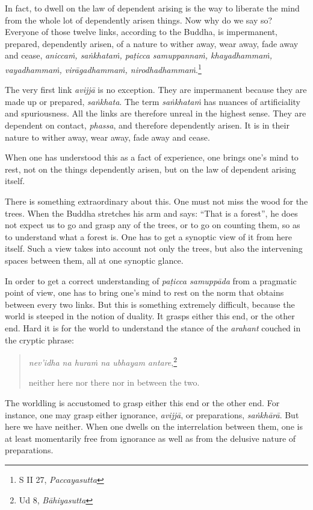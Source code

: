In fact, to dwell on the law of dependent arising is the way to liberate the mind from the whole lot of dependently arisen things. Now why do we say so? Everyone of those twelve links, according to the Buddha, is impermanent, prepared, dependently arisen, of a nature to wither away, wear away, fade away and cease, \emph{aniccaṁ, saṅkhataṁ, paṭicca samuppannaṁ, khayadhammaṁ, vayadhammaṁ, virāgadhammaṁ, nirodhadhammaṁ}.\footnote{S II 27, \emph{Paccayasutta}}

The very first link \emph{avijjā} is no exception. They are impermanent because they are made up or prepared, \emph{saṅkhata}. The term \emph{saṅkhataṁ} has nuances of artificiality and spuriousness. All the links are therefore unreal in the highest sense. They are dependent on contact, \emph{phassa}, and therefore dependently arisen. It is in their nature to wither away, wear away, fade away and cease.

When one has understood this as a fact of experience, one brings one's mind to rest, not on the things dependently arisen, but on the law of dependent arising itself.

There is something extraordinary about this. One must not miss the wood for the trees. When the Buddha stretches his arm and says: ``That is a forest'', he does not expect us to go and grasp any of the trees, or to go on counting them, so as to understand what a forest is. One has to get a synoptic view of it from here itself. Such a view takes into account not only the trees, but also the intervening spaces between them, all at one synoptic glance.

In order to get a correct understanding of \emph{paṭicca samuppāda} from a pragmatic point of view, one has to bring one's mind to rest on the norm that obtains between every two links. But this is something extremely difficult, because the world is steeped in the notion of duality. It grasps either this end, or the other end. Hard it is for the world to understand the stance of the \emph{arahant} couched in the cryptic phrase:

\begin{quote}
\emph{nev'idha na huraṁ na ubhayam antare},\footnote{Ud 8, \emph{Bāhiyasutta}}

neither here nor there nor in between the two.
\end{quote}

The worldling is accustomed to grasp either this end or the other end. For instance, one may grasp either ignorance, \emph{avijjā}, or preparations, \emph{saṅkhārā}. But here we have neither. When one dwells on the interrelation between them, one is at least momentarily free from ignorance as well as from the delusive nature of preparations.

